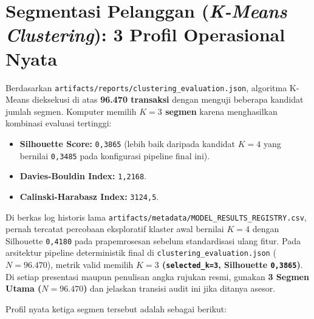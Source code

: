 \documentclass[11pt,a4paper,oneside]{book}
\newcommand{\code}[1]{{\small\nolinkurl{#1}}}
\begin{document}
\section{Segmentasi Pelanggan (\emph{K-Means Clustering}): 3 Profil Operasional Nyata}

Berdasarkan \code{artifacts/reports/clustering_evaluation.json}, algoritma K-Means dieksekusi di atas \textbf{96.470 transaksi} dengan menguji beberapa kandidat jumlah segmen. Komputer memilih \textbf{$K = 3$ segmen} karena menghasilkan kombinasi evaluasi tertinggi:
\begin{itemize}
  \item \textbf{Silhouette Score:} \code{0,3865} (lebih baik daripada kandidat $K=4$ yang bernilai \code{0,3485} pada konfigurasi pipeline final ini).
  \item \textbf{Davies-Bouldin Index:} \code{1,2168}.
  \item \textbf{Calinski-Harabasz Index:} \code{3124,5}.
\end{itemize}

\begin{kejujuranbox}[Sinkronisasi Angka Historis Registry \code{K=4} vs Artefak \code{K=3}]
Di berkas log historis lama \code{artifacts/metadata/MODEL_RESULTS_REGISTRY.csv}, pernah tercatat percobaan eksploratif klaster awal bernilai $K=4$ dengan Silhouette \code{0,4180} pada prapemrosesan sebelum standardisasi ulang fitur. Pada arsitektur pipeline deterministik final di \code{clustering_evaluation.json} ($N=96.470$), metrik valid memilih \textbf{$K=3$ (\code{selected_k=3}, Silhouette \code{0,3865})}. Di setiap presentasi maupun penulisan angka rujukan resmi, gunakan \textbf{3 Segmen Utama ($N=96.470$)} dan jelaskan transisi audit ini jika ditanya asesor.
\end{kejujuranbox}

Profil nyata ketiga segmen tersebut adalah sebagai berikut:
\end{document}
